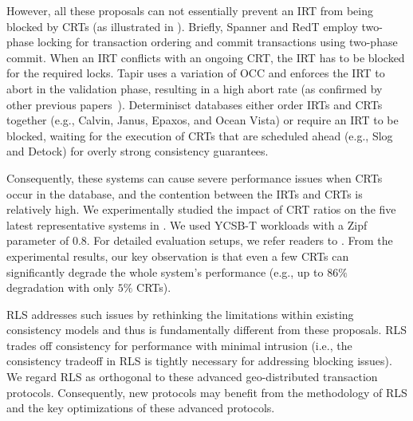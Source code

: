 However, all these proposals can not essentially prevent an IRT from being blocked by CRTs (as illustrated in ). Briefly, Spanner and RedT employ two-phase locking for transaction ordering and commit transactions using two-phase commit. When an IRT conflicts with an ongoing CRT, the IRT has to be blocked for the required locks. Tapir uses a variation of OCC and enforces the IRT to abort in the validation phase, resulting in a high abort rate (as confirmed by other previous papers~\cite{ov:vldb19, chen2021achieving}). Determinisct databases either order IRTs and CRTs together (e.g., Calvin, Janus, Epaxos, and Ocean Vista) or require an IRT to be blocked, waiting for the execution of CRTs that are scheduled ahead (e.g., Slog and Detock) for overly strong consistency guarantees.


Consequently, these systems can cause severe performance issues when CRTs occur in the database, and the contention between the IRTs and CRTs is relatively high. We experimentally studied the impact of CRT ratios on the five latest representative systems in . We used YCSB-T workloads with a Zipf parameter of 0.8. For detailed evaluation setups, we refer readers to . From the experimental results, our key observation is that even a few CRTs can significantly degrade the whole system's performance (e.g., up to $86\%$ degradation with only $5\%$ CRTs).



RLS addresses such issues by rethinking the limitations within existing consistency models and thus is fundamentally different from these proposals. RLS trades off consistency for performance with minimal intrusion (i.e., the consistency tradeoff in RLS is tightly necessary for addressing blocking issues). We regard RLS as orthogonal to these advanced geo-distributed transaction protocols. Consequently, new protocols may benefit from the methodology of RLS and the key optimizations of these advanced protocols.